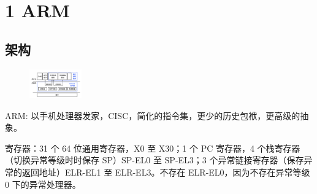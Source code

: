 \section{1 ARM}

\subsection{架构}

\begin{figure}[h]
  \centering
  \includegraphics[width=0.2\textwidth]{imgs/chcore.png}
\end{figure}

ARM: 以手机处理器发家，CISC，简化的指令集，更少的历史包袱，更高级的抽象。

寄存器：31 个 64 位通用寄存器，X0 至 X30；1 个 PC 寄存器，4 个栈寄存器（切换异常等级时时保存 SP）SP-EL0 至 SP-EL3；3 个异常链接寄存器（保存异常的返回地址）ELR-EL1 至 ELR-EL3。不存在 ELR-EL0，因为不存在异常等级 0 下的异常处理器。